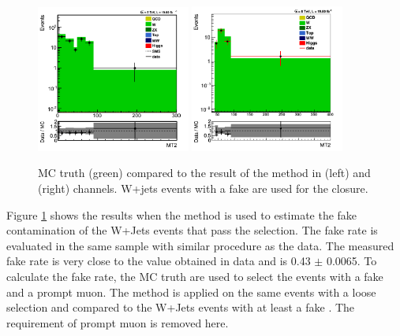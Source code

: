 \begin{figure}[!Hhtb]
\centering
\includegraphics[width=0.45\textwidth,keepaspectratio=true]{FakeRateMuTau/Estimation_pfWJets_ExtraLepExcl_SameSignWeightedHiggs.png}
\includegraphics[width=0.45\textwidth,keepaspectratio=true]{FakeRateEleTau/Closure.png}
\caption{MC truth (green) compared to the result of the method in \muTau (left) and \eTau (right) channels. W+jets events with a fake \Tau are used for the closure.}
\label{fig:LepTauClusure}
\end{figure}
Figure \ref{fig:LepTauClusure} shows the results when the method is used to estimate the fake contamination of the W+Jets events that pass the selection. 
The fake rate is evaluated in the same sample with similar procedure as the data. The measured fake rate is very close to
the value obtained in data and is 0.43 $\pm$  0.0065. To calculate the fake rate, the MC truth are used to select the events with a fake \Tau 
and a prompt muon. The method is applied on the same events with a loose \Tau selection and compared to the W+Jets events with at least 
a fake \Tau. The requirement of prompt muon is removed here.

